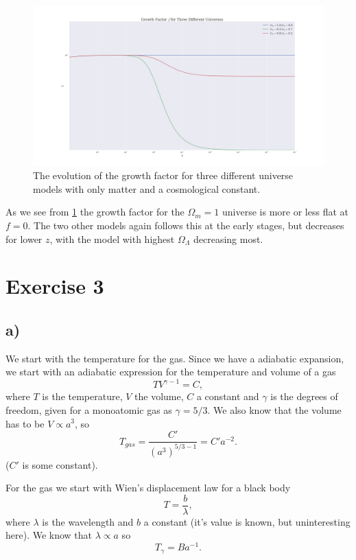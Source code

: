 \documentclass[a4paper,norsk, 10pt]{article}
\begin{document}
\begin{figure}[!h]
\centering
\includegraphics[scale=0.25]{z_v_f}
\caption{The evolution of the growth factor for three different universe models with only matter and a cosmological constant.}\label{fig:z_v_f}
\end{figure}

As we see from \ref{fig:z_v_f} the growth factor for the $\Omega_{m} = 1$ universe is more or less flat at $f = 0$. The two other models again follows this at the early stages, but decreases for lower $z$, with the model with highest $\Omega_{\Lambda}$ decreasing most.

\section{Exercise 3}
\subsection{a)}
We start with the temperature for the gas. Since we have a adiabatic expansion, we start with an adiabatic expression for the temperature and volume of a gas
\begin{equation}
TV^{\gamma - 1} = C,
\end{equation}
where $T$ is the temperature, $V$ the volume, $C$ a constant and $\gamma$ is the degrees of freedom, given for a monoatomic gas as $\gamma = 5/3$. We also know that the volume has to be $V \propto a^{3}$, so
\begin{equation}
T_{gas} = \frac{C'}{(a^3)^{5/3 - 1}} = C'a^{-2}.
\end{equation}
($C'$ is some constant). 

For the gas we start with Wien's displacement law for a black body
\begin{equation}
T = \frac{b}{\lambda},
\end{equation}
where $\lambda$ is the wavelength and $b$ a constant (it's value is known, but uninteresting here). We know that $\lambda \propto a$ so
\begin{equation}
T_{\gamma} = Ba^{-1}.
\end{equation}
\end{document}
